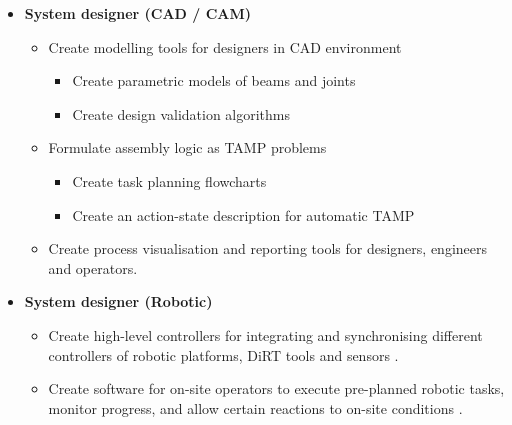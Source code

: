 \begin{itemize}
	\item \textbf{System designer (CAD / CAM)}

	\begin{itemize}
		\item Create modelling tools for designers in CAD environment 
		\begin{itemize}

			\item Create parametric models of beams and joints 

			\item Create design validation algorithms 

		\end{itemize}
		\item Formulate assembly logic as TAMP problems

		\begin{itemize}
			\item Create task planning flowcharts\\
			\item Create an action-state description for automatic TAMP 

		\end{itemize}
		\item Create process visualisation and reporting tools for designers, engineers and operators. 

	\end{itemize}
	\item \textbf{System designer (Robotic)}

	\begin{itemize}
		\item Create high-level controllers for integrating and synchronising different controllers of robotic platforms, DiRT tools and sensors .

		\item Create software for on-site operators to execute pre-planned robotic tasks, monitor progress, and allow certain reactions to on-site conditions .


\end{itemize}
\end{itemize}
